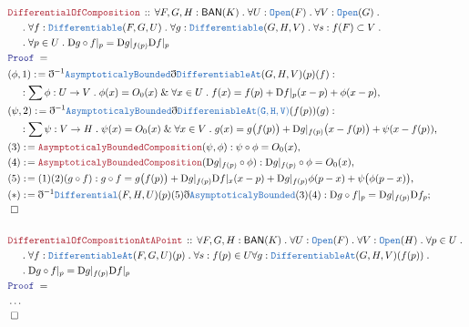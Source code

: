 \documentclass[12pt]{scrartcl}
\newcommand{\TYPE}[1]{\textcolor{NavyBlue}{\mathtt{#1}}}
\newcommand{\LOGIC}[1]{\textcolor{Blue}{\mathtt{#1}}}
\newcommand{\THM}[1]{\textcolor{Maroon}{\mathtt{#1}}}
\renewcommand{\.}{\; . \;}
\newcommand{\de}{: \kern 0.1pc =}
\newcommand{\Theorem}[2]{& \THM{#1} \, :: \, #2 \\ & \Proof = \\ }
\newcommand{\NewLine}{\\ & \kern 1pc}
\newcommand{\Page}[1]{\begin{align*} #1 \end{align*}   }
\newcommand{ \bd }{ \ByDef }
\newcommand{\NoProof}{ & \ldots \\ \EndProof}
\renewcommand{\And}{\; \& \;}
\newcommand{\Say}[3]{& #1 \de #2 : #3, \\}
\newcommand{\Conclude}[3]{& #1 \de #2 : #3; \\}
\newcommand{\QED}{\; \square}
\newcommand{\EndProof}{& \QED \\}
\newcommand{\ByDef}{\eth}
\newcommand{\Proof}{\LOGIC{Proof} \; }
\newcommand{\BAN}{\mathsf{BAN}} %
\newcommand{\D}{\mathrm{D}}
\begin{document}
\newpage
\Page{
	\Theorem{DifferentialOfComposition}{\forall F,G,H : \BAN(K) \. \forall U : \TYPE{Open}(F) \. \forall V : \TYPE{Open}(G) \.
	\NewLine \.
	\forall f : \TYPE{Differentiable}(F,G,U) \. \forall g : \TYPE{Differentiable}(G,H,V) \. \forall s : f(F) \subset V \.
	\NewLine \.
	\forall p \in U \. \D g \circ f |_p =  \D g |_{f(p)} \D f |_p
	}
	\Say{ (\phi,1) }{ \bd^{-1} \TYPE{AsymptoticalyBounded} \bd \TYPE{DifferentiableAt}(G,H,V)(p)(f)  }
	{ 
	\NewLine :
	\sum \phi : U \to V \.  \phi(x) = O_0( x  )  \And \forall x \in U \. f(x) = f(p)  + \D f |_p (x - p) + \phi(x - p)     }
	\Say{ (\psi,2)}{ \bd^{-1} \TYPE{AsymptoticalyBounded} \bd \TYPE{DiffereniableAt(G,H,V)}(f(p))(g)}
	{ 
	\NewLine :
	\sum \psi : V \to H \. \psi(x) = O_0(x  ) \And  \forall x \in V \. g(x) = 
		g\big(f(p)\big) + \D g |_{f(p)}  \big(x - f(p)\big) + \psi(x - f(p))     }
	\Say{(3)}{\THM{AsymptoticalyBoundedComposition}(\psi,\phi)}{ \psi \circ \phi = O_0(x) }
	\Say{(4)}{\THM{AsymptoticalyBoundedComposition}(\D g |_{f(p)} \circ \phi)}{ \D g |_{f(p)} \circ \phi = O_0(x) }
	\Say{(5)}{  (1)(2)(g \circ f)   }{ g \circ f = g\big( f(p) \big)  +  \D g |_{f(p)} \D f |_{x}(x - p) + \D g |_{f(p)} \phi(p - x) + \psi\big( \phi(p - x) \big)  }
	\Conclude{(*)}{ \bd^{-1} \TYPE{Differential}(F,H,U)(p) (5) \bd \TYPE{AsymptoticalyBounded}(3)(4)  }
	{ \D g \circ f |_p = \D g |_{f(p)} \D f_p  }
	\EndProof
	\\
	\Theorem{DifferentialOfCompositionAtAPoint}{ 
		\forall F,G,H : \BAN(K) \. \forall U : \TYPE{Open}(F) \. \forall V : \TYPE{Open}(H) \. \forall p \in U \. 
		\NewLine \.
		\forall f : \TYPE{DifferentiableAt}(F,G,U)(p) \.  \forall s : f(p) \in U
		\forall g : \TYPE{DifferentiableAt}(G,H,V)(f(p))  \.
		\NewLine
		\. \D g \circ f |_p = \D g |_{f(p)} \D f |_{p} 
	}
	\NoProof
}
\newpage
\end{document}
